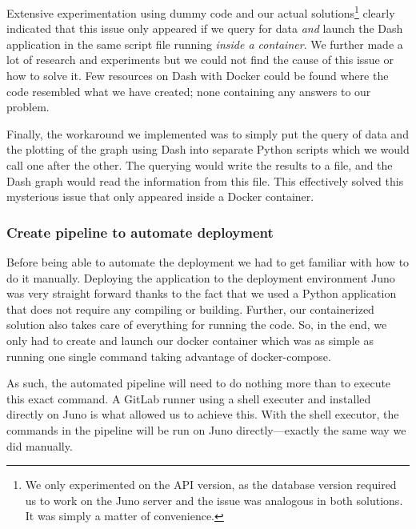 Extensive experimentation using dummy code and our actual
solutions\footnote{We only experimented on the API version, as the
	database version required us to work on the Juno server and the
	issue was analogous in both solutions. It was simply a matter of
convenience.} clearly indicated that this issue only appeared if we
query for data \emph{and} launch the Dash application in the same
script file running \emph{inside a container}. We further made a lot
of research and experiments but we could not find the cause of this
issue or how to solve it. Few resources on Dash with Docker could be
found where the code resembled what we have created; none containing
any answers to our problem.

Finally, the workaround we implemented was to simply put the query of
data and the plotting of the graph using Dash into separate Python
scripts which we would call one after the other. The querying would
write the results to a file, and the Dash graph would read the
information from this file. This effectively solved this mysterious
issue that only appeared inside a Docker container.

\subsubsection{Create pipeline to automate deployment}

Before being able to automate the deployment we had to get familiar
with how to do it manually. Deploying the application to the
deployment environment Juno was very
straight forward thanks to the fact that we used a Python application
that does not require any compiling or building. Further, our
containerized solution also takes care of everything for running the
code. So, in the end, we only had to create and launch our docker
container which was as simple as running one single command taking
advantage of docker-compose.

As such, the automated pipeline will need to do nothing more than to
execute this exact command.
A GitLab runner using a shell executer and installed 
directly on Juno is what allowed us to achieve this. With the shell
executor, the commands in
the pipeline will be run on Juno directly---exactly the same way
we did manually.

